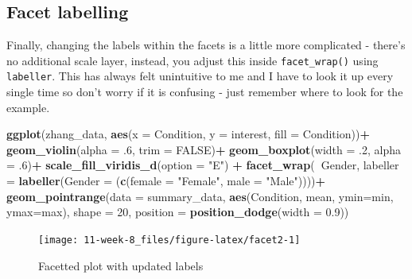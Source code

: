 \documentclass[]{book}
\newenvironment{Shaded}{\begin{snugshade}}{\end{snugshade}}
\newcommand{\DataTypeTok}[1]{\textcolor[rgb]{0.13,0.29,0.53}{#1}}
\newcommand{\DecValTok}[1]{\textcolor[rgb]{0.00,0.00,0.81}{#1}}
\newcommand{\FloatTok}[1]{\textcolor[rgb]{0.00,0.00,0.81}{#1}}
\newcommand{\KeywordTok}[1]{\textcolor[rgb]{0.13,0.29,0.53}{\textbf{#1}}}
\newcommand{\NormalTok}[1]{#1}
\newcommand{\OperatorTok}[1]{\textcolor[rgb]{0.81,0.36,0.00}{\textbf{#1}}}
\newcommand{\OtherTok}[1]{\textcolor[rgb]{0.56,0.35,0.01}{#1}}
\newcommand{\StringTok}[1]{\textcolor[rgb]{0.31,0.60,0.02}{#1}}
\begin{document}
\hypertarget{facet-labelling}{%
\subsection{Facet labelling}\label{facet-labelling}}

Finally, changing the labels within the facets is a little more complicated - there's no additional scale layer, instead, you adjust this inside \texttt{facet\_wrap()} using \texttt{labeller}. This has always felt unintuitive to me and I have to look it up every single time so don't worry if it is confusing - just remember where to look for the example.

\begin{Shaded}
\begin{Highlighting}[]
\KeywordTok{ggplot}\NormalTok{(zhang_data, }\KeywordTok{aes}\NormalTok{(}\DataTypeTok{x =}\NormalTok{ Condition, }\DataTypeTok{y =}\NormalTok{ interest, }\DataTypeTok{fill =}\NormalTok{ Condition))}\OperatorTok{+}
\StringTok{  }\KeywordTok{geom_violin}\NormalTok{(}\DataTypeTok{alpha =} \FloatTok{.6}\NormalTok{, }\DataTypeTok{trim =} \OtherTok{FALSE}\NormalTok{)}\OperatorTok{+}
\StringTok{  }\KeywordTok{geom_boxplot}\NormalTok{(}\DataTypeTok{width =} \FloatTok{.2}\NormalTok{, }\DataTypeTok{alpha =} \FloatTok{.6}\NormalTok{)}\OperatorTok{+}
\StringTok{  }\KeywordTok{scale_fill_viridis_d}\NormalTok{(}\DataTypeTok{option =} \StringTok{"E"}\NormalTok{) }\OperatorTok{+}
\StringTok{  }\KeywordTok{facet_wrap}\NormalTok{(}\OperatorTok{~}\NormalTok{Gender, }\DataTypeTok{labeller =} \KeywordTok{labeller}\NormalTok{(}\DataTypeTok{Gender =}\NormalTok{ (}\KeywordTok{c}\NormalTok{(}\DataTypeTok{female =} \StringTok{"Female"}\NormalTok{, }\DataTypeTok{male =} \StringTok{"Male"}\NormalTok{))))}\OperatorTok{+}
\StringTok{  }\KeywordTok{geom_pointrange}\NormalTok{(}\DataTypeTok{data =}\NormalTok{ summary_data,}
                  \KeywordTok{aes}\NormalTok{(Condition, mean, }\DataTypeTok{ymin=}\NormalTok{min, }\DataTypeTok{ymax=}\NormalTok{max),}
                  \DataTypeTok{shape =} \DecValTok{20}\NormalTok{, }
                  \DataTypeTok{position =} \KeywordTok{position_dodge}\NormalTok{(}\DataTypeTok{width =} \FloatTok{0.9}\NormalTok{))}
\end{Highlighting}
\end{Shaded}

\begin{figure}

{\centering \texttt{[image: 11-week-8\_files/figure-latex/facet2-1]} 

}

\caption{Facetted plot with updated labels}\label{fig:facet2}
\end{figure}
\end{document}

